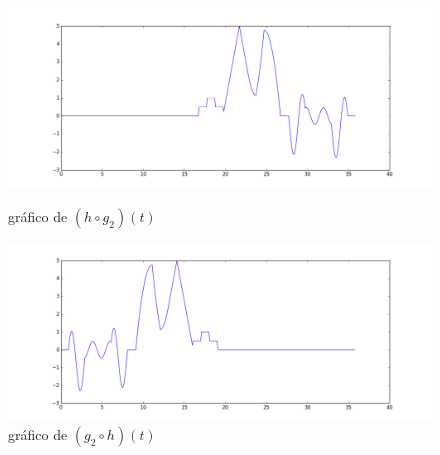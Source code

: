 \documentclass[12pt]{article}
\begin{document}
\begin{figure}[!h]
	\centering
	\begin{minipage}[b]{0.49\linewidth}
		\includegraphics[width=1.15\linewidth]{hog2.png}
		\caption{gráfico de $(h\circ g_2)(t)$}
	\end{minipage}
	\hfill
	\begin{minipage}[b]{0.49\linewidth}
		\includegraphics[width=1.15\linewidth]{g2oh.png}
		\caption{gráfico de $(g_2\circ h)(t)$}
	\end{minipage}
\end{figure}
\end{document}
